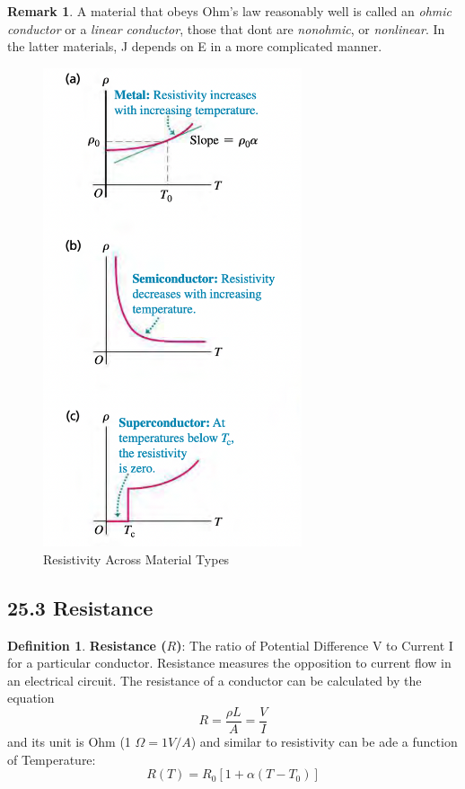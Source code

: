 \documentclass[12pt]{amsart}
\theoremstyle{definition}
\newtheorem{definition}{Definition} %
\newtheorem*{remark}{Remark}        %
\numberwithin{equation}{theorem}    %
\begin{document}
\begin{remark}
    A material that obeys Ohm’s law reasonably well is called an \textit{ohmic 
    conductor} or a \textit{linear conductor}, those that dont are \textit{nonohmic}, 
    or \textit{nonlinear}. In the latter materials, J depends on E in a more complicated manner.
\end{remark}

\begin{figure}[H]
    \centering
    \includegraphics[width=3in,scale=0.25]{Media/Resistivity.png}
    \caption{Resistivity Across Material Types}
    \label{Resistivity Across Material Types}
\end{figure}

\subsection*{25.3 Resistance}

\begin{definition}
    \textbf{Resistance ($R$)}:
    The ratio of Potential Difference V to Current I for a particular conductor.
    Resistance measures the opposition to current flow in an electrical circuit.
    The resistance of a conductor can be calculated by the equation
    $$R = \frac{\rho L}{A} = \frac{V}{I}$$ and its unit is Ohm (1 $\Omega = 1V/A$)
    and similar to resistivity can be ade a function of Temperature:
    $$R(T) = R_0[1+\alpha(T-T_0)]$$
\end{definition}
\end{document}
